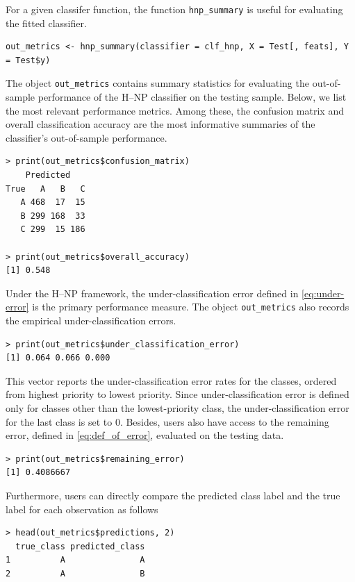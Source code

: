 For a given classifer function, the function \texttt{hnp\_summary} is useful for evaluating the fitted classifier.
\begin{verbatim}
out_metrics <- hnp_summary(classifier = clf_hnp, X = Test[, feats], Y = Test$y)
\end{verbatim}
The object \texttt{out\_metrics} contains summary statistics for evaluating the out-of-sample performance of the H--NP classifier on the testing sample. Below, we list the most relevant performance metrics. Among these, the confusion matrix and overall classification accuracy are the most informative summaries of the classifier's out-of-sample performance.
\begin{verbatim}
> print(out_metrics$confusion_matrix)
    Predicted
True   A   B   C
   A 468  17  15
   B 299 168  33
   C 299  15 186
   
> print(out_metrics$overall_accuracy)
[1] 0.548
\end{verbatim}

Under the H--NP framework, the under-classification error defined in \eqref{eq:under-error} is the primary performance measure. The object \texttt{out\_metrics} also records the empirical under-classification errors.
\begin{verbatim}
> print(out_metrics$under_classification_error)
[1] 0.064 0.066 0.000
\end{verbatim}
This vector reports the under-classification error rates for the classes, ordered from highest priority to lowest priority. Since under-classification error is defined only for classes other than the lowest-priority class, the under-classification error for the last class is set to \(0\). Besides, users also have access to the remaining error, defined in \eqref{eq:def_of_error}, evaluated on the testing data.
\begin{verbatim}
> print(out_metrics$remaining_error)
[1] 0.4086667
\end{verbatim}
Furthermore, users can directly compare the predicted class label and the true label for each observation as follows
\begin{verbatim}
> head(out_metrics$predictions, 2)
  true_class predicted_class
1          A               A
2          A               B
\end{verbatim}


